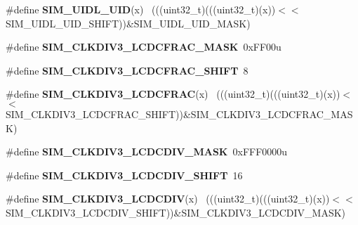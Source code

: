\begin{DoxyCompactItemize}
\item 
\hypertarget{group___s_i_m___register___masks_gadf1a47bfdde94787a3e6e785332aef8e}{}\#define {\bfseries S\+I\+M\+\_\+\+U\+I\+D\+L\+\_\+\+U\+I\+D}(x)                                                ~(((uint32\+\_\+t)(((uint32\+\_\+t)(x))$<$$<$S\+I\+M\+\_\+\+U\+I\+D\+L\+\_\+\+U\+I\+D\+\_\+\+S\+H\+I\+F\+T))\&S\+I\+M\+\_\+\+U\+I\+D\+L\+\_\+\+U\+I\+D\+\_\+\+M\+A\+S\+K)\label{group___s_i_m___register___masks_gadf1a47bfdde94787a3e6e785332aef8e}

\item 
\hypertarget{group___s_i_m___register___masks_ga613c43e223be94f007c005f0736a5c98}{}\#define {\bfseries S\+I\+M\+\_\+\+C\+L\+K\+D\+I\+V3\+\_\+\+L\+C\+D\+C\+F\+R\+A\+C\+\_\+\+M\+A\+S\+K}~0x\+F\+F00u\label{group___s_i_m___register___masks_ga613c43e223be94f007c005f0736a5c98}

\item 
\hypertarget{group___s_i_m___register___masks_gaf7b7c0d5dd2dd773aac666810f74980d}{}\#define {\bfseries S\+I\+M\+\_\+\+C\+L\+K\+D\+I\+V3\+\_\+\+L\+C\+D\+C\+F\+R\+A\+C\+\_\+\+S\+H\+I\+F\+T}~8\label{group___s_i_m___register___masks_gaf7b7c0d5dd2dd773aac666810f74980d}

\item 
\hypertarget{group___s_i_m___register___masks_ga066aaf31afa6b018cb9082f1f8e3a1ae}{}\#define {\bfseries S\+I\+M\+\_\+\+C\+L\+K\+D\+I\+V3\+\_\+\+L\+C\+D\+C\+F\+R\+A\+C}(x)                                ~(((uint32\+\_\+t)(((uint32\+\_\+t)(x))$<$$<$S\+I\+M\+\_\+\+C\+L\+K\+D\+I\+V3\+\_\+\+L\+C\+D\+C\+F\+R\+A\+C\+\_\+\+S\+H\+I\+F\+T))\&S\+I\+M\+\_\+\+C\+L\+K\+D\+I\+V3\+\_\+\+L\+C\+D\+C\+F\+R\+A\+C\+\_\+\+M\+A\+S\+K)\label{group___s_i_m___register___masks_ga066aaf31afa6b018cb9082f1f8e3a1ae}

\item 
\hypertarget{group___s_i_m___register___masks_ga5e11a7f1bcf920349e4fcf9fb6981053}{}\#define {\bfseries S\+I\+M\+\_\+\+C\+L\+K\+D\+I\+V3\+\_\+\+L\+C\+D\+C\+D\+I\+V\+\_\+\+M\+A\+S\+K}~0x\+F\+F\+F0000u\label{group___s_i_m___register___masks_ga5e11a7f1bcf920349e4fcf9fb6981053}

\item 
\hypertarget{group___s_i_m___register___masks_gade1603461eec92aed5dc96be6aa7e4f5}{}\#define {\bfseries S\+I\+M\+\_\+\+C\+L\+K\+D\+I\+V3\+\_\+\+L\+C\+D\+C\+D\+I\+V\+\_\+\+S\+H\+I\+F\+T}~16\label{group___s_i_m___register___masks_gade1603461eec92aed5dc96be6aa7e4f5}

\item 
\hypertarget{group___s_i_m___register___masks_ga752a93eeb84acc7c29272c88fc25621e}{}\#define {\bfseries S\+I\+M\+\_\+\+C\+L\+K\+D\+I\+V3\+\_\+\+L\+C\+D\+C\+D\+I\+V}(x)                                  ~(((uint32\+\_\+t)(((uint32\+\_\+t)(x))$<$$<$S\+I\+M\+\_\+\+C\+L\+K\+D\+I\+V3\+\_\+\+L\+C\+D\+C\+D\+I\+V\+\_\+\+S\+H\+I\+F\+T))\&S\+I\+M\+\_\+\+C\+L\+K\+D\+I\+V3\+\_\+\+L\+C\+D\+C\+D\+I\+V\+\_\+\+M\+A\+S\+K)\label{group___s_i_m___register___masks_ga752a93eeb84acc7c29272c88fc25621e}


\end{DoxyCompactItemize}
